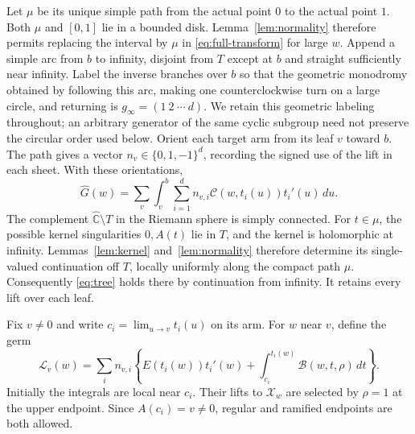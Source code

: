 \documentclass[11pt]{article}
\numberwithin{equation}{section}
\theoremstyle{definition}\newtheorem{definition}[theorem]{Definition}
\theoremstyle{remark}\newtheorem{remark}[theorem]{Remark}
\newcommand{\C}{\mathbb C}
\newcommand{\CC}{\mathcal C}
\newcommand{\HH}{\widehat G}
\newcommand{\dd}{\,d}
\begin{document}
Let $\mu$ be its unique simple path from the actual point $0$ to the actual
point $1$. Both $\mu$ and $[0,1]$ lie in a bounded disk. Lemma~\ref{lem:normality}
therefore permits replacing the interval by $\mu$ in
\eqref{eq:full-transform} for large $w$.
Append a simple arc from $b$ to infinity, disjoint from $T$ except at
$b$ and straight sufficiently near infinity. Label the inverse branches
over $b$ so that the geometric monodromy obtained by following this arc,
making one counterclockwise turn on a large circle, and returning is
$g_\infty=(1\ 2\ \cdots\ d)$. We retain this geometric labeling throughout;
an arbitrary generator of the same cyclic subgroup need not preserve
the circular order used below. Orient each target arm from its leaf
$v$ toward $b$. The path gives a vector
$n_v\in\{0,1,-1\}^d$, recording the signed use of the lift in each sheet.
With these orientations,
\begin{equation}\label{eq:tree}
 \HH(w)=\sum_v\int_v^b\sum_{i=1}^d n_{v,i}
             \CC(w,t_i(u))t_i'(u)\dd u.
\end{equation}
The complement $\widehat{\C}\setminus T$ in the Riemann sphere is
simply connected. For $t\in\mu$, the possible kernel singularities
$0,A(t)$ lie in $T$, and the kernel is holomorphic at infinity.
Lemmas~\ref{lem:kernel} and~\ref{lem:normality} therefore determine its
single-valued continuation off $T$, locally uniformly along the compact
path $\mu$. Consequently \eqref{eq:tree} holds there by continuation from
infinity. It retains every lift over each leaf.

Fix $v\ne0$ and write $c_i=\lim_{u\to v}t_i(u)$ on its arm. For $w$
near $v$, define the germ
\begin{equation}\label{eq:leaf-germ}
 \mathscr L_v(w)=\sum_i n_{v,i}
 \left\{E(t_i(w))t_i'(w)+
 \int_{c_i}^{t_i(w)}\mathscr B(w,t,\rho)\dd t\right\}.
\end{equation}
Initially the integrals are local near $c_i$. Their lifts to $\mathscr X_w$
are selected by $\rho=1$ at the upper endpoint. Since $A(c_i)=v\ne0$,
regular and ramified endpoints are both allowed.
\end{document}
